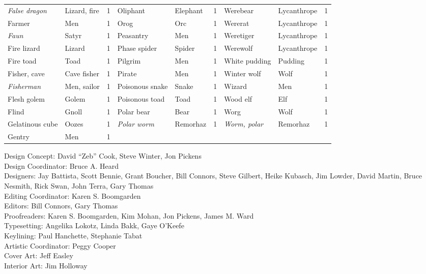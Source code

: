 \documentclass[../main.tex]{subfiles}
\begin{document}
\begin{table}[H]
{\begin{tabular}{llcllcllc}
\textit{False dragon} & Lizard, fire & 1 & Oliphant & Elephant & 1 & Werebear & Lycanthrope & 1 \\
Farmer & Men & 1 & Orog & Orc & 1 & Wererat & Lycanthrope & 1 \\
\textit{Faun} & Satyr & 1 & Peasantry & Men & 1 & Weretiger & Lycanthrope & 1 \\
Fire lizard & Lizard & 1 & Phase spider & Spider & 1 & Werewolf & Lycanthrope & 1 \\
Fire toad & Toad & 1 & Pilgrim & Men & 1 & White pudding & Pudding & 1 \\
Fisher, cave & Cave fisher & 1 & Pirate & Men & 1 & Winter wolf & Wolf & 1 \\
\textit{Fisherman} & Men, sailor & 1 & Poisonous snake & Snake & 1 & Wizard & Men & 1 \\
Flesh golem & Golem & 1 & Poisonous toad & Toad & 1 & Wood elf & Elf & 1 \\
Flind & Gnoll & 1 & Polar bear & Bear & 1 & Worg & Wolf & 1 \\
Gelatinous cube & Oozes & 1 & \textit{Polar worm} & Remorhaz & 1 & \textit{Worm, polar} & Remorhaz & 1 \\
Gentry & Men & 1 &  &  &  &  &  & 
\end{tabular}%
}
\end{table}

\noindent\textcolor{dndblue}{Design Concept:} David “Zeb” Cook, Steve Winter, Jon Pickens\\
\textcolor{dndblue}{Design Coordinator:} Bruce A. Heard\\
\textcolor{dndblue}{Designers:} Jay Battista, Scott Bennie, Grant Boucher, Bill Connors, Steve Gilbert, Heike Kubasch, Jim Lowder, David Martin, Bruce Nesmith, Rick Swan, John Terra, Gary Thomas\\
\textcolor{dndblue}{Editing Coordinator:} Karen S. Boomgarden\\
\textcolor{dndblue}{Editors:} Bill Connors, Gary Thomas\\
\textcolor{dndblue}{Proofreaders:} Karen S. Boomgarden, Kim Mohan, Jon Pickens, James M. Ward\\
\textcolor{dndblue}{Typesetting:} Angelika Lokotz, Linda Bakk, Gaye O'Keefe\\
\textcolor{dndblue}{Keylining:} Paul Hanchette, Stephanie Tabat\\
\textcolor{dndblue}{Artistic Coordinator:} Peggy Cooper\\
\textcolor{dndblue}{Cover Art:} Jeff Easley\\
\textcolor{dndblue}{Interior Art:} Jim Holloway\\
\end{document}
